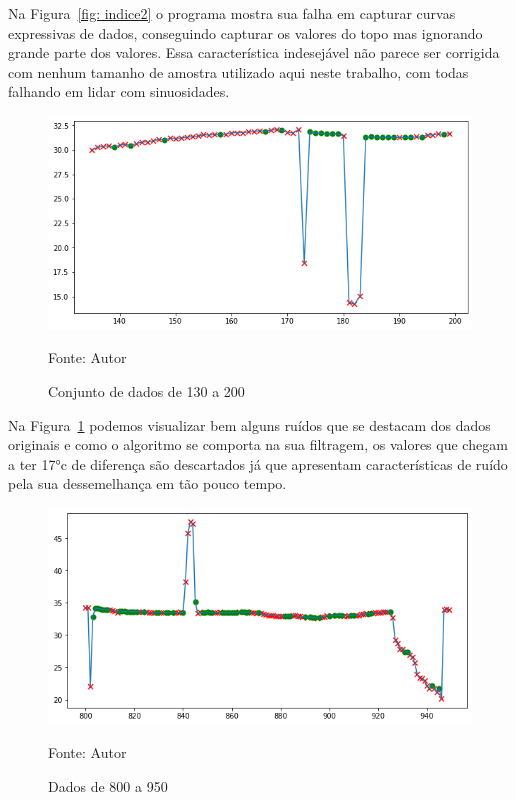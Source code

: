 Na Figura~\ref{fig: indice2} o programa mostra sua falha em capturar curvas expressivas de dados, conseguindo capturar os valores do topo mas ignorando grande parte dos valores. Essa característica indesejável não parece ser corrigida com nenhum tamanho de amostra utilizado aqui neste trabalho, com todas falhando em lidar com sinuosidades.

\begin{figure}[H]
	\centering
	\includegraphics[width=15cm]{imagens/sensores/indice4.png}
	\caption{Conjunto de dados de 130 a 200}
	Fonte: Autor
	\label{fig: indice4}
\end{figure}

Na Figura~\ref{fig: indice4} podemos visualizar bem alguns ruídos que se destacam dos dados originais e como o algoritmo se comporta na sua filtragem, os valores que chegam a ter \ang{17}c de diferença são descartados já que apresentam características de ruído pela sua dessemelhança em tão pouco tempo.

\begin{figure}[H]
	\centering
	\includegraphics[width=15cm]{imagens/sensores/indice3.png}
	\caption{Dados de 800 a 950}
	Fonte: Autor
	\label{fig: indice3}
\end{figure}

